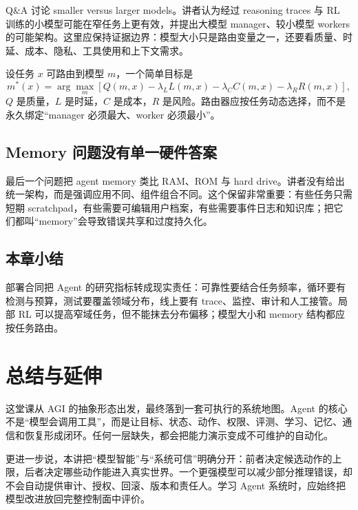 \documentclass[a4paper]{article}
\begin{document}
Q\&A 讨论 smaller versus larger models。讲者认为经过 reasoning traces 与 RL 训练的小模型可能在窄任务上更有效，并提出大模型 manager、较小模型 workers 的可能架构。这里应保持证据边界：模型大小只是路由变量之一，还要看质量、时延、成本、隐私、工具使用和上下文需求。


设任务 $x$ 可路由到模型 $m$，一个简单目标是
\[
m^*(x)=\arg\max_m\left[
Q(m,x)-\lambda_L L(m,x)-\lambda_C C(m,x)-\lambda_R R(m,x)
\right],
\]
$Q$ 是质量，$L$ 是时延，$C$ 是成本，$R$ 是风险。路由器应按任务动态选择，而不是永久绑定“manager 必须最大、worker 必须最小”。

\subsection{Memory 问题没有单一硬件答案}

最后一个问题把 agent memory 类比 RAM、ROM 与 hard drive。讲者没有给出统一架构，而是强调应用不同、组件组合不同。这个保留非常重要：有些任务只需短期 scratchpad，有些需要可编辑用户档案，有些需要事件日志和知识库；把它们都叫“memory”会导致错误共享和过度持久化。


\subsection{本章小结}

部署合同把 Agent 的研究指标转成现实责任：可靠性要结合任务频率，循环要有检测与预算，测试要覆盖领域分布，线上要有 trace、监控、审计和人工接管。局部 RL 可以提高窄域任务，但不能抹去分布偏移；模型大小和 memory 结构都应按任务路由。

\section{总结与延伸}

这堂课从 AGI 的抽象形态出发，最终落到一套可执行的系统地图。Agent 的核心不是“模型会调用工具”，而是让目标、状态、动作、权限、评测、学习、记忆、通信和恢复形成闭环。任何一层缺失，都会把能力演示变成不可维护的自动化。

更进一步说，本讲把“模型智能”与“系统可信”明确分开：前者决定候选动作的上限，后者决定哪些动作能进入真实世界。一个更强模型可以减少部分推理错误，却不会自动提供审计、授权、回滚、版本和责任人。学习 Agent 系统时，应始终把模型改进放回完整控制面中评价。
\end{document}
